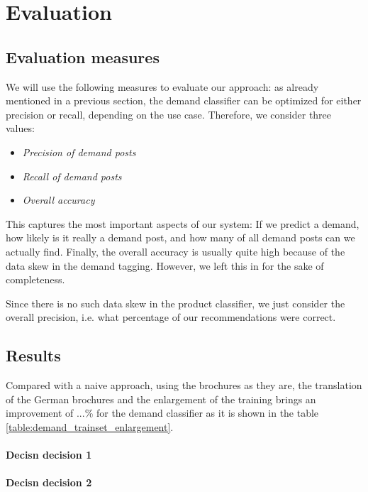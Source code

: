 
\section{Evaluation}
\label{sec:evaluation}


\subsection{Evaluation measures}
\label{sub:evaluation_measures}
We will use the following measures to evaluate our approach:
as already mentioned in a previous section, the demand classifier can be optimized for either precision or recall, depending on the use case.
Therefore, we consider three values:
\begin{itemize}
	\item
		\emph{Precision of demand posts} 
	\item
		\emph{Recall of demand posts} 
	\item
		\emph{Overall accuracy} 
\end{itemize}
This captures the most important aspects of our system: If we predict a demand, how likely is it really a demand post, and how many of all demand posts can we actually find.
Finally, the overall accuracy is usually quite high because of the data skew in the demand tagging.
However, we left this in for the sake of completeness.

Since there is no such data skew in the product classifier, we just consider the overall precision, i.e. what percentage of our recommendations were correct.


\subsection{Results}
\label{sub:results}

Compared with a naive approach, using the brochures as they are, the translation of the German brochures and the enlargement of the training brings an improvement of ...\% for the demand classifier as it is shown in the table \ref{table:demand_trainset_enlargement}.
\paragraph{Decisn decision 1}
\paragraph{Decisn decision 2}
